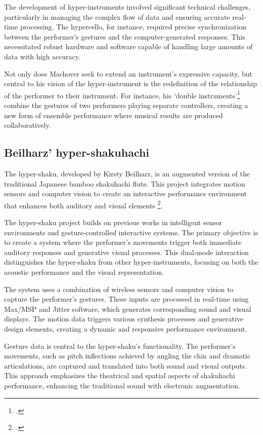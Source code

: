 \documentclass[12pt,twoside,maitrise]{dms_ks}
\theoremstyle{definition}
\begin{document}
{{The development of hyper-instruments involved significant technical challenges, particularly in managing the complex flow of data and ensuring accurate real-time processing. 
The hypercello, for instance, required precise synchronization between the performer's gestures and the computer-generated responses. 
This necessitated robust hardware and software capable of handling large amounts of data with high accuracy.

Not only does Machover seek to extend an instrument's expressive capacity, but central to his vision of the hyper-instrument is the redefinition of the relationship of the performer to their instrument. 
For instance, his `double instruments'\footcite[189]{machover_hyper-instruments_1989} combine the gestures of two performers playing separate controllers, creating a new form of ensemble performance where musical results are produced collaboratively.

\subsection{Beilharz' hyper-shakuhachi}

The hyper-shaku, developed by Kirsty Beilharz, is an augmented version of the traditional Japanese bamboo shakuhachi flute. 
This project integrates motion sensors and computer vision to create an interactive performance environment that enhances both auditory and visual elements \footcite{beilharz_hyper-shaku_2006}. 

The hyper-shaku project builds on previous works in intelligent sensor environments and gesture-controlled interactive systems. 
The primary objective is to create a system where the performer's movements trigger both immediate auditory responses and generative visual processes. 
This dual-mode interaction distinguishes the hyper-shaku from other hyper-instruments, focusing on both the acoustic performance and the visual representation.

The system uses a combination of wireless sensors and computer vision to capture the performer's gestures. 
These inputs are processed in real-time using Max/MSP and Jitter software, which generates corresponding sound and visual displays. 
The motion data triggers various synthesis processes and generative design elements, creating a dynamic and responsive performance environment.

Gesture data is central to the hyper-shaku's functionality. 
The performer's movements, such as pitch inflections achieved by angling the chin and dramatic articulations, are captured and translated into both sound and visual outputs. 
This approach emphasizes the theatrical and spatial aspects of shakuhachi performance, enhancing the traditional sound with electronic augmentation.

}}
\end{document}
